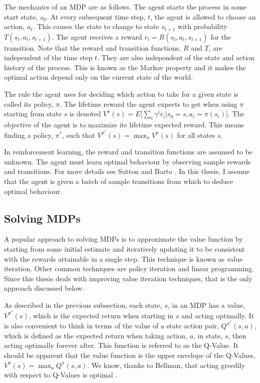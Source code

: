 The mechanics of an MDP are as follows. The agent starts the process in some
start state, $s_0$.
At every subsequent time step, $t$, the agent is allowed to choose an action,
$a_t$.
This causes the state to change to state $s_{t+1}$ with probability
$T(s_t,a_t,s_{t+1})$.
The agent receives a reward $r_t = R(s_t,a_t,s_{t+1})$ for the
transition.
Note that the reward and transition functions, $R$ and $T$, are independent
of the time step $t$.
They are also independent of the state and action history of the process.
This is known as the Markov property and it makes the optimal action
depend only on the current state of the world.

The rule the agent uses for deciding which action to take for a given state
is called its policy, $\pi$.
The lifetime reward the agent expects to get when using $\pi$ starting from
state $s$ is denoted
$V^\pi(s) = E\big[\sum_i \gamma^i r_i | s_0 = s, a_i = \pi(s_i)\big]$.
The objective of the agent is to maximize its lifetime expected reward.
This means finding a policy, $\pi^*$, such that
$V^{\pi^*}(s) = \max_\pi V^\pi(s)$ for all states $s$.

In reinforcement learning, the reward and transition functions are assumed to
be unknown. The agent must learn optimal behaviour by observing sample
rewards and transitions.
For more details see Sutton and Barto \cite{rlai}.
In this thesis, I assume that the agent is given a batch of sample
transitions from which to deduce optimal behaviour.

\subsection{Solving MDPs}
A popular approach to solving MDPs is to approximate the value function
by starting from some initial estimate and iteratively updating it to be
consistent with the rewards attainable in a single step.
This technique is known as value iteration.
Other common techniques are policy iteration and linear programming.
Since this thesis deals with improving value iteration techniques,
that is the only approach discussed below.

As described in the previous subsection, each state, $s$, in an MDP has a
value, $V^{\pi^*}(s)$, which is the expected return when starting in $s$ and
acting optimally.
It is also convenient to think in terms of the value of a state action pair,
$Q^{\pi^*}(s,a)$, which is defined as the expected return when taking action,
$a$, in state, $s$, then acting optimally forever after.
This function is referred to as the Q-Value.
It should be apparent that the value function is the upper envelope of the
Q-Values, $V^\pi(s) = \max_a Q^\pi(s,a)$.
We know, thanks to Bellman, that acting greedily with respect to Q-Values is
optimal \cite{put}.


